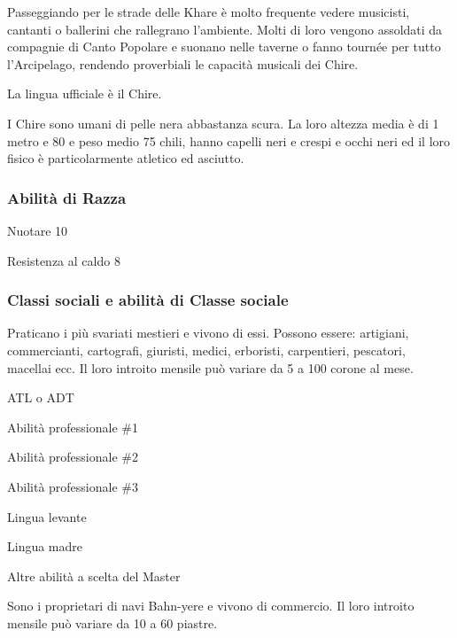 Passeggiando per le strade delle Khare \`e molto frequente vedere
musicisti, cantanti o ballerini che rallegrano l'ambiente. Molti di
loro vengono assoldati da compagnie di Canto Popolare e suonano nelle
taverne o fanno tourn\'ee per tutto l'Arcipelago, rendendo proverbiali
le capacit\`a musicali dei Chire.

La lingua ufficiale \`e il Chire. 

\Fisico I Chire sono umani di pelle nera abbastanza scura. La loro
altezza media \`e di 1 metro e 80 e peso medio 75 chili, hanno capelli
neri e crespi e occhi neri ed il loro fisico \`e particolarmente
atletico ed asciutto.

\minmaxumani

\subsubsection{Abilit\`a di Razza}

\begin{abilist}
\item Nuotare 10 
\item Resistenza al caldo 8 
\end{abilist}

\subsubsection{Classi sociali e abilit\`a di Classe sociale}


Praticano i pi\`u svariati mestieri e vivono di essi. Possono essere:
artigiani, commercianti, cartografi, giuristi, medici, erboristi,
carpentieri, pescatori, macellai ecc. Il loro introito mensile pu\`o
variare da 5 a 100 corone al mese.

\begin{abilist}
\item ATL o ADT 
\item Abilit\`a professionale \#1 
\item Abilit\`a professionale \#2
\item Abilit\`a professionale \#3 
\item Lingua levante
\item Lingua madre 
\item Altre abilit\`a a scelta del Master 
\end{abilist}


Sono i proprietari di navi Bahn-yere e vivono di commercio. Il
loro introito mensile pu\`o variare da 10 a 60 piastre.

